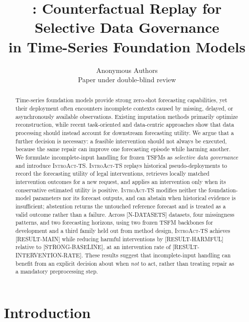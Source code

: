 \documentclass{article}
\title{\introact{}: Counterfactual Replay for Selective Data Governance \\
in Time-Series Foundation Models}
\author{Anonymous Authors\\Paper under double-blind review}
\newcommand{\ph}[1]{\textcolor{phgray}{\textsf{[#1]}}}
\newcommand{\introact}{\textsc{IntroAct-TS}}
\newcommand{\tsfm}{TSFM}
\begin{document}
\maketitle

\begin{abstract}
Time-series foundation models provide strong zero-shot forecasting capabilities, yet
their deployment often encounters incomplete contexts caused by missing, delayed, or
asynchronously available observations. Existing imputation methods primarily optimize
reconstruction, while recent task-oriented and data-centric approaches show that data
processing should instead account for downstream forecasting utility. We argue that a
further decision is necessary: a feasible intervention should not always be executed,
because the same repair can improve one forecasting episode while harming another. We
formulate incomplete-input handling for frozen \tsfm{}s as \emph{selective data
governance} and introduce \introact{}. \introact{} replays historical
pseudo-deployments to record the forecasting utility of legal interventions, retrieves
locally matched intervention outcomes for a new request, and applies an intervention
only when its conservative estimated utility is positive. \introact{} modifies neither
the foundation-model parameters nor its forecast outputs, and can abstain when
historical evidence is insufficient; abstention returns the untouched reference forecast
and is treated as a valid outcome rather than a failure. Across \ph{N-DATASETS} datasets,
four missingness patterns, and two forecasting horizons, using two frozen \tsfm{}
backbones for development and a third family held out from method design,
\introact{} achieves \ph{RESULT-MAIN} while reducing harmful interventions by
\ph{RESULT-HARMFUL} relative to \ph{STRONG-BASELINE}, at an intervention rate of
\ph{RESULT-INTERVENTION-RATE}. These results suggest that incomplete-input handling can
benefit from an explicit decision about when \emph{not} to act, rather than treating
repair as a mandatory preprocessing step.
\end{abstract}

\section{Introduction}
\label{sec:intro}
\end{document}
